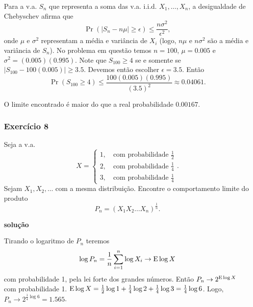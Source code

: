 \begin{frame}[allowframebreaks]
\begin{exercise}
  Para a v.a. $S_n$ que representa a soma das v.a. i.i.d. $X_1, \ldots, X_n$, a desigualdade de Chebyschev
  afirma que 
  \begin{equation}
  \Pr \left( \vert S_n - n\mu  \vert \geq \epsilon \right) \leq \frac{n \sigma^2}{\epsilon^2} ,
  \end{equation} 
  onde $\mu$ e $\sigma^2$ representam a média e variância de $X_i$ (logo, $n\mu$ e $n\sigma^2$ são
  a média e variância de $S_n$). 
  \exercisebreak
  No problema em questão temos $n=100$, $\mu=0.005$ e $\sigma^2 = (0.005)(0.995)$.
  Note que $S_{100} \geq 4$ se e somente se $\vert S_{100} - 100(0.005) \vert \geq 3.5$. Devemos então
  escolher $\epsilon = 3.5$. Então
  \begin{equation}
  \Pr \left( S_{100} \geq 4 \right)  \leq  \frac{100 (0.005) (0.995)}{(3.5)^2} \approx 0.04061 .
  \end{equation} 

  O limite encontrado é maior do que a real probabilidade $0.00167$.
 
  \end{exercise}
\end{frame}



\begin{frame}[allowframebreaks]
  \frametitle{Exercício 8}
  \begin{exercise}
  Seja a v.a.
  \begin{equation}
  X = \begin{cases} 1 , \quad \text{com probabilidade } \frac{1}{2} \\
		2, \quad \text{com probabilidade } \frac{1}{4} \\
		3, \quad \text{com probabilidade } \frac{1}{4} 
	 \end{cases} .
  \end{equation}
  Sejam $X_1, X_2, \ldots$ com a mesma distribuição. Encontre o comportamento limite do produto
  \begin{equation}
  P_n = (X_1 X_2 \ldots X_n)^{\frac{1}{n}} .
  \end{equation}

  \exercisebreak  

  \textbf{solução}
  
  Tirando o logaritmo de $P_n$ teremos
  \begin{equation}
  \log P_n = \frac{1}{n} \sum_{i=1}^{n} \log X_i \rightarrow \mathrm{E} \log X  
  \end{equation}
  com probabilidade 1, pela lei forte dos grandes números. Então $P_n \rightarrow 2^{\mathrm{E} \log X}$
  com probabilidade 1. $\mathrm{E} \log X = \frac{1}{2} \log 1 + \frac{1}{4} \log 2 + \frac{1}{4} \log 3 = \frac{1}{4} \log 6$.
  Logo, $P_n \rightarrow 2^{\frac{1}{4} \log 6} = 1.565$.


  \end{exercise}
\end{frame}



